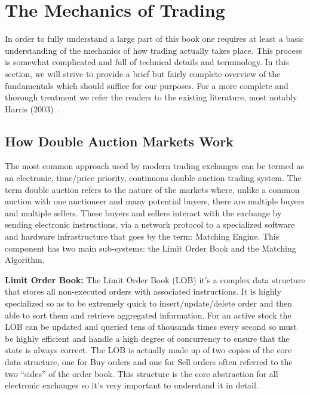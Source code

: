 \section{The Mechanics of Trading}

In order to fully understand a large part of this book one requires at least a basic understanding of the mechanics of how trading actually takes place. This process is somewhat complicated and full of technical details and terminology. In this section, we will strive to provide a brief but fairly complete overview of the fundamentals which should suffice for our purposes. For a more complete and thorough treatment we refer the readers to the existing literature, most notably Harris (2003)~\cite{harris03trade}.


\subsection{How Double Auction Markets Work}

The most common approach used by modern trading exchanges can be termed as an electronic, time/price priority, continuous double auction trading system. The term double auction refers to the nature of the markets where, unlike a common auction with one auctioneer and many potential buyers, there are multiple buyers and multiple sellers. These buyers and sellers interact with the exchange by sending electronic instructions, via a network protocol to a specialized software and hardware infrastructure that goes by the term: Matching Engine. This component has two main sub-systems: the Limit Order Book and the Matching Algorithm.

\noindent\textbf{Limit Order Book:}
The Limit Order Book (LOB) it's a complex data structure that stores all non-executed orders with associated instructions. It is highly specialized so as to be extremely quick to insert/update/delete order and then able to sort them and retrieve aggregated information. For an active stock the LOB can be updated and queried tens of thousands times every second so must be highly efficient and handle a high degree of concurrency to ensure that the state is always correct.  The LOB is actually made up of two copies of the core data structure, one for Buy orders and one for Sell orders often referred to the two ``sides'' of the order book. This structure is the core abstraction for all electronic exchanges so it's very important to understand it in detail. \twomedskip


